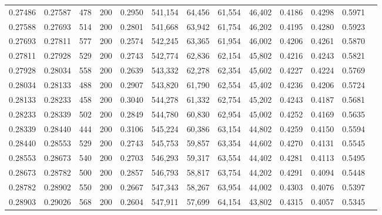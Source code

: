\begin{tabular}{rrrrrrrrrrrrr}
0.27486 & 0.27587 &    478 & 200 &                                     0.2950 & 541,154 &  64,456 &  61,554 &  46,402 & 0.4186 & 0.4298 & 0.5971 \\
0.27588 & 0.27693 &    514 & 200 &                                     0.2801 & 541,668 &  63,942 &  61,754 &  46,202 & 0.4195 & 0.4280 & 0.5923 \\
0.27693 & 0.27811 &    577 & 200 &                                     0.2574 & 542,245 &  63,365 &  61,954 &  46,002 & 0.4206 & 0.4261 & 0.5870 \\
0.27811 & 0.27928 &    529 & 200 &                                     0.2743 & 542,774 &  62,836 &  62,154 &  45,802 & 0.4216 & 0.4243 & 0.5821 \\
0.27928 & 0.28034 &    558 & 200 &                                     0.2639 & 543,332 &  62,278 &  62,354 &  45,602 & 0.4227 & 0.4224 & 0.5769 \\
0.28034 & 0.28133 &    488 & 200 &                                     0.2907 & 543,820 &  61,790 &  62,554 &  45,402 & 0.4236 & 0.4206 & 0.5724 \\
0.28133 & 0.28233 &    458 & 200 &                                     0.3040 & 544,278 &  61,332 &  62,754 &  45,202 & 0.4243 & 0.4187 & 0.5681 \\
0.28233 & 0.28339 &    502 & 200 &                                     0.2849 & 544,780 &  60,830 &  62,954 &  45,002 & 0.4252 & 0.4169 & 0.5635 \\
0.28339 & 0.28440 &    444 & 200 &                                     0.3106 & 545,224 &  60,386 &  63,154 &  44,802 & 0.4259 & 0.4150 & 0.5594 \\
0.28440 & 0.28553 &    529 & 200 &                                     0.2743 & 545,753 &  59,857 &  63,354 &  44,602 & 0.4270 & 0.4131 & 0.5545 \\
0.28553 & 0.28673 &    540 & 200 &                                     0.2703 & 546,293 &  59,317 &  63,554 &  44,402 & 0.4281 & 0.4113 & 0.5495 \\
0.28673 & 0.28782 &    500 & 200 &                                     0.2857 & 546,793 &  58,817 &  63,754 &  44,202 & 0.4291 & 0.4094 & 0.5448 \\
0.28782 & 0.28902 &    550 & 200 &                                     0.2667 & 547,343 &  58,267 &  63,954 &  44,002 & 0.4303 & 0.4076 & 0.5397 \\
0.28903 & 0.29026 &    568 & 200 &                                     0.2604 & 547,911 &  57,699 &  64,154 &  43,802 & 0.4315 & 0.4057 & 0.5345 \\

\end{tabular}
